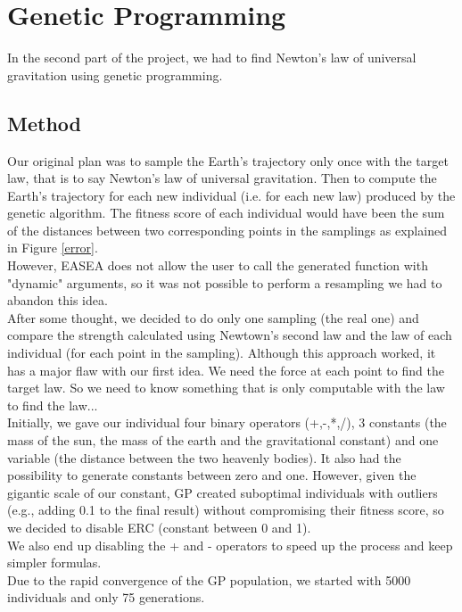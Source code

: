 \section{Genetic Programming}
In the second part of the project, we had to find Newton's law of universal
gravitation using genetic programming.

\subsection{Method}
Our original plan was to sample the Earth's trajectory only once with the
target law, that is to say Newton's law of universal gravitation. Then to
compute the Earth's trajectory for each new individual (i.e. for each new law)
produced by the genetic algorithm. The fitness score of each individual would
have been the sum of the distances between two corresponding points in the
samplings as explained in Figure \ref{error}.\\

However, EASEA does not allow the user to call the generated function with
"dynamic" arguments, so it was not possible to perform a resampling we had to
abandon this idea.\\
After some thought, we decided to do only one sampling (the real one) and
compare the strength calculated using Newtown's second law and the law of each
individual (for each point in the sampling). Although this approach worked, it
has a major flaw with our first idea. We need the force at each point to find
the target law. So we need to know something that is only computable with the
law to find the law...\\

Initially, we gave our individual four binary operators (+,-,*,/), 3 constants
(the mass of the sun, the mass of the earth and the gravitational constant) and
one variable (the distance between the two heavenly bodies). It also had the
possibility to generate constants between zero and one. However, given the
gigantic scale of our constant, GP created suboptimal individuals with outliers
(e.g., adding 0.1 to the final result) without compromising their fitness
score, so we decided to disable ERC (constant between 0 and 1).\\
We also end up disabling the + and - operators to speed up the process and keep
simpler formulas.\\

Due to the rapid convergence of the GP population, we started with 5000
individuals and only 75 generations.\\

